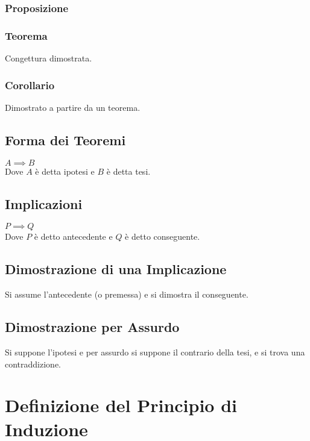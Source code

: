 \documentclass[a4paper, twoside, italian, 11pt]{book}
\begin{document}
\subsubsection{Proposizione}


\subsubsection{Teorema}

\noindent
Congettura dimostrata.


\subsubsection{Corollario}

\noindent
Dimostrato a partire da un teorema.


\subsection{Forma dei Teoremi}

\noindent
$A \implies B$ \\

\noindent
Dove $A$ è detta ipotesi e $B$ è detta tesi.


\subsection{Implicazioni}

\noindent
$P \implies Q$ \\

\noindent
Dove $P$ è detto antecedente e $Q$ è detto conseguente.


\subsection{Dimostrazione di una Implicazione}

\noindent
Si assume l'antecedente (o premessa) e si dimostra il conseguente.


\subsection{Dimostrazione per Assurdo}

\noindent
Si suppone l'ipotesi e per assurdo si suppone il contrario della tesi, e si trova una contraddizione.



\section{Definizione del Principio di Induzione}
\end{document}
